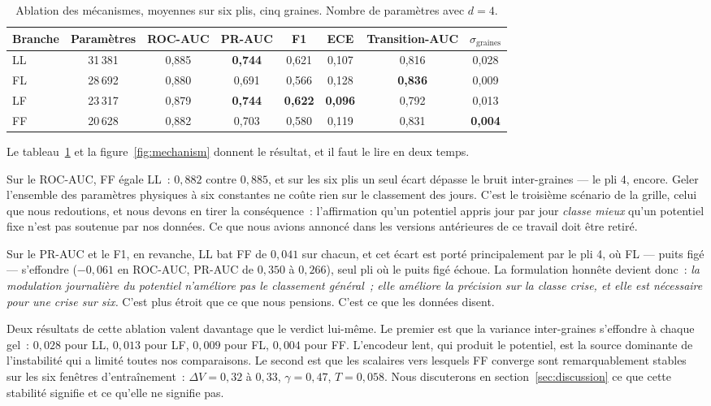 \documentclass[11pt,a4paper]{article}
\newcommand{\dV}{\Delta V}
\begin{document}
\begin{table}[htbp]
\centering\small
\caption{Ablation des mécanismes, moyennes sur six plis, cinq graines. Nombre de paramètres avec $d=4$.}
\label{tab:mechanism}
\begin{tabular}{lccccccc}
\toprule
Branche & Paramètres & ROC-AUC & PR-AUC & F1 & ECE & Transition-AUC & $\sigma_{\text{graines}}$ \\
\midrule
LL & 31\,381 & 0,885 & \textbf{0,744} & 0,621 & 0,107 & 0,816 & 0,028 \\
FL & 28\,692 & 0,880 & 0,691 & 0,566 & 0,128 & \textbf{0,836} & 0,009 \\
LF & 23\,317 & 0,879 & \textbf{0,744} & \textbf{0,622} & \textbf{0,096} & 0,792 & 0,013 \\
FF & 20\,628 & 0,882 & 0,703 & 0,580 & 0,119 & 0,831 & \textbf{0,004} \\
\bottomrule
\end{tabular}
\end{table}

Le tableau~\ref{tab:mechanism} et la figure~\ref{fig:mechanism} donnent le résultat, et il faut le lire en deux temps.

Sur le ROC-AUC, FF égale LL~: $0{,}882$ contre $0{,}885$, et sur les six plis un seul écart dépasse le bruit inter-graines --- le pli 4, encore. Geler l'ensemble des paramètres physiques à six constantes ne coûte rien sur le classement des jours. C'est le troisième scénario de la grille, celui que nous redoutions, et nous devons en tirer la conséquence~: l'affirmation qu'un potentiel appris jour par jour \emph{classe mieux} qu'un potentiel fixe n'est pas soutenue par nos données. Ce que nous avions annoncé dans les versions antérieures de ce travail doit être retiré.

Sur le PR-AUC et le F1, en revanche, LL bat FF de $0{,}041$ sur chacun, et cet écart est porté principalement par le pli 4, où FL --- puits figé --- s'effondre ($-0{,}061$ en ROC-AUC, PR-AUC de $0{,}350$ à $0{,}266$), seul pli où le puits figé échoue. La formulation honnête devient donc~: \emph{la modulation journalière du potentiel n'améliore pas le classement général~; elle améliore la précision sur la classe crise, et elle est nécessaire pour une crise sur six.} C'est plus étroit que ce que nous pensions. C'est ce que les données disent.

Deux résultats de cette ablation valent davantage que le verdict lui-même. Le premier est que la variance inter-graines s'effondre à chaque gel~: $0{,}028$ pour LL, $0{,}013$ pour LF, $0{,}009$ pour FL, $0{,}004$ pour FF. L'encodeur lent, qui produit le potentiel, est la source dominante de l'instabilité qui a limité toutes nos comparaisons. Le second est que les scalaires vers lesquels FF converge sont remarquablement stables sur les six fenêtres d'entraînement~: $\dV = 0{,}32$ à $0{,}33$, $\gamma = 0{,}47$, $T = 0{,}058$. Nous discuterons en section~\ref{sec:discussion} ce que cette stabilité signifie et ce qu'elle ne signifie pas.
\end{document}
